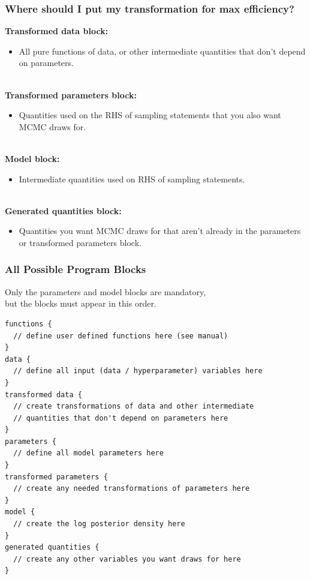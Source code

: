 \documentclass[xcolor=dvipsnames]{beamer}
\begin{document}
\begin{frame}[fragile]
\frametitle{Where should I put my transformation for max efficiency?}
\textbf{Transformed data block:}
\begin{itemize}
\item All pure functions of data, or other intermediate quantities that don't depend on parameters.\\~\\
\end{itemize}
\textbf{Transformed parameters block:}
\begin{itemize}
\item Quantities used on the RHS of sampling statements that you also want MCMC draws for.\\~\\
\end{itemize}
\textbf{Model block:}
\begin{itemize}
\item Intermediate quantities used on RHS of sampling statements.\\~\\
\end{itemize}
\textbf{Generated quantities block:}
\begin{itemize}
\item Quantities you want MCMC draws for that aren't already in the parameters or transformed parameters block.
\end{itemize}
\end{frame}

\begin{frame}[fragile]
\frametitle{All Possible Program Blocks}
Only the parameters and model blocks are mandatory,\\
but the blocks must appear in this order.
{\tiny
\begin{verbatim}
functions {
  // define user defined functions here (see manual)
}
data {
  // define all input (data / hyperparameter) variables here
}
transformed data {
  // create transformations of data and other intermediate
  // quantities that don't depend on parameters here
}
parameters {
  // define all model parameters here
}
transformed parameters {
  // create any needed transformations of parameters here
}
model {
  // create the log posterior density here
}
generated quantities {
  // create any other variables you want draws for here
}
\end{verbatim}}
\end{frame}
\end{document}
